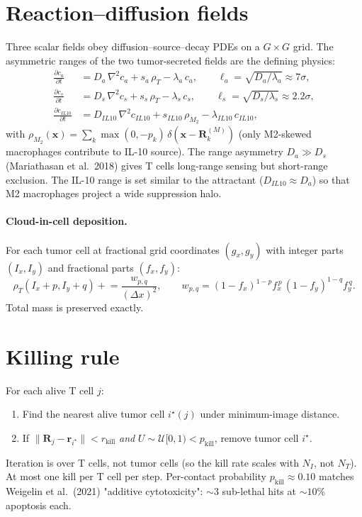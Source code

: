 \documentclass[11pt,letterpaper]{article}
\begin{document}
\section{Reaction--diffusion fields}
\label{sec:m1-fields}

Three scalar fields obey diffusion--source--decay PDEs on a $G\times G$
grid. The asymmetric ranges of the two tumor-secreted fields are the
defining physics:
\begin{align}
\frac{\partial c_a}{\partial t}
   &= D_a\,\nabla^2 c_a + s_a\,\rho_T - \lambda_a\, c_a,
   \qquad \ell_a = \sqrt{D_a/\lambda_a} \approx 7\sigma,
   \label{eq:rd_a}\\
\frac{\partial c_s}{\partial t}
   &= D_s\,\nabla^2 c_s + s_s\,\rho_T - \lambda_s\, c_s,
   \qquad \ell_s = \sqrt{D_s/\lambda_s} \approx 2.2\sigma,
   \label{eq:rd_s}\\
\frac{\partial c_{IL10}}{\partial t}
   &= D_{IL10}\,\nabla^2 c_{IL10} + s_{IL10}\,\rho_{M_2} - \lambda_{IL10}\, c_{IL10},
   \label{eq:rd_il10}
\end{align}
with $\rho_{M_2}(\mathbf{x}) = \sum_k \max(0,-p_k)\,\delta(\mathbf{x}-\mathbf{R}_k^{(M)})$
(only M2-skewed macrophages contribute to IL-10 source). The range
asymmetry $D_a \gg D_s$ (Mariathasan et al.\ 2018) gives T cells
long-range sensing but short-range exclusion. The IL-10 range is set
similar to the attractant ($D_{IL10}\approx D_a$) so that M2 macrophages
project a wide suppression halo.

\paragraph{Cloud-in-cell deposition.}
For each tumor cell at fractional grid coordinates $(g_x,g_y)$ with
integer parts $(I_x,I_y)$ and fractional parts $(f_x,f_y)$:
\begin{equation}
\rho_T(I_x{+}p, I_y{+}q) \mathrel{+}=
   \frac{w_{p,q}}{(\Delta x)^2}, \qquad
w_{p,q} = (1{-}f_x)^{1-p} f_x^{\,p}\,(1{-}f_y)^{1-q} f_y^{\,q}.
\end{equation}
Total mass is preserved exactly.

\section{Killing rule}

For each alive T cell $j$:
\begin{enumerate}[nosep,leftmargin=*]
  \item Find the nearest alive tumor cell $i^\star(j)$ under
        minimum-image distance.
  \item If $\|\mathbf{R}_j - \mathbf{r}_{i^\star}\| < r_{\text{kill}}$
        \emph{and} $U \sim \mathcal{U}[0,1) < p_{\text{kill}}$, remove
        tumor cell $i^\star$.
\end{enumerate}
Iteration is over T cells, not tumor cells (so the kill rate scales with
$N_I$, not $N_T$). At most one kill per T cell per step. Per-contact
probability $p_{\text{kill}} \approx 0.10$ matches Weigelin et al.\ (2021)
"additive cytotoxicity": $\sim 3$ sub-lethal hits at $\sim 10\%$ apoptosis
each.
\end{document}
